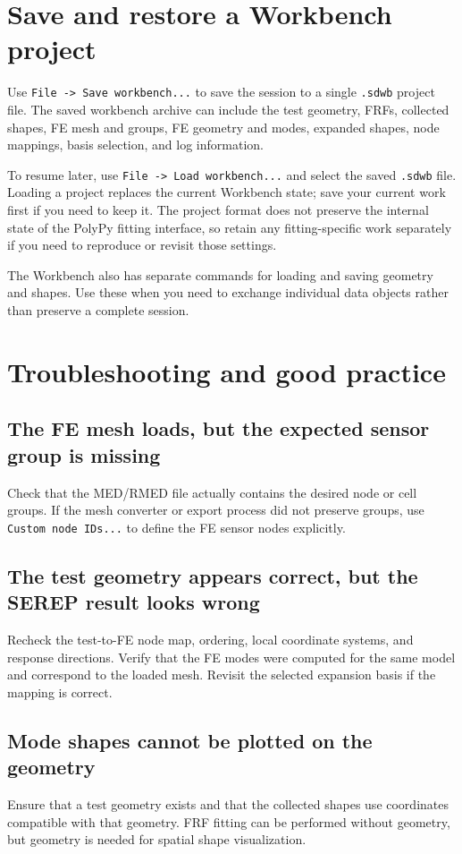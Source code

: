 \documentclass[11pt]{article}
\begin{document}
\section{Save and restore a Workbench project}
\label{sec:orge8917dd}

Use \texttt{File -> Save workbench...} to save the session to a single \texttt{.sdwb} project file. The saved workbench archive can include the test geometry, FRFs, collected shapes, FE mesh and groups, FE geometry and modes, expanded shapes, node mappings, basis selection, and log information.

To resume later, use \texttt{File -> Load workbench...} and select the saved \texttt{.sdwb} file. Loading a project replaces the current Workbench state; save your current work first if you need to keep it. The project format does not preserve the internal state of the PolyPy fitting interface, so retain any fitting-specific work separately if you need to reproduce or revisit those settings.

The Workbench also has separate commands for loading and saving geometry and shapes. Use these when you need to exchange individual data objects rather than preserve a complete session.
\section{Troubleshooting and good practice}
\label{sec:orgc799883}

\subsection{The FE mesh loads, but the expected sensor group is missing}
\label{sec:orgd92c2dd}
Check that the MED/RMED file actually contains the desired node or cell groups. If the mesh converter or export process did not preserve groups, use \texttt{Custom node IDs...} to define the FE sensor nodes explicitly.
\subsection{The test geometry appears correct, but the SEREP result looks wrong}
\label{sec:orgf808a9e}
Recheck the test-to-FE node map, ordering, local coordinate systems, and response directions. Verify that the FE modes were computed for the same model and correspond to the loaded mesh. Revisit the selected expansion basis if the mapping is correct.
\subsection{Mode shapes cannot be plotted on the geometry}
\label{sec:orga54af99}
Ensure that a test geometry exists and that the collected shapes use coordinates compatible with that geometry. FRF fitting can be performed without geometry, but geometry is needed for spatial shape visualization.
\end{document}
